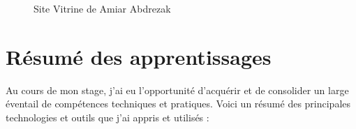 \begin{figure}[H]
    \begin{center}
        \caption{Site Vitrine de Amiar Abdrezak}
    \end{center}
\end{figure}


\section{Résumé des apprentissages}

Au cours de mon stage, j'ai eu l'opportunité d'acquérir et de consolider un large éventail de compétences techniques et pratiques. Voici un résumé des principales technologies et outils que j'ai appris et utilisés :

